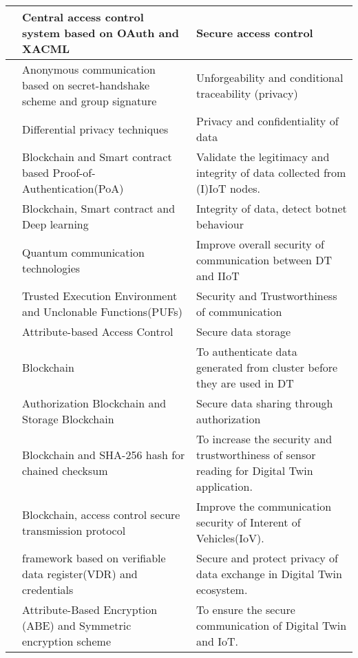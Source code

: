 \begin{table}[H]
\begin{NiceTabular}{|p{1.0cm}|p{5.5cm}|p{6.0cm}|}
    \cite{gehrmannDigitalTwinBased2020} & Central access control system based on OAuth and XACML &  Secure access control\\
    \hline
    \cite{xuEfficientAuthenticationVehicular2021} & Anonymous communication based on secret-handshake scheme and group signature & Unforgeability and conditional
traceability (privacy)\\
    \hline
    \cite{wuDeepLearningDriven2022} & Differential privacy techniques & Privacy and confidentiality of data \\
    \hline
    \cite{kumarBlockchainDeepLearning2022} & Blockchain and Smart contract based Proof-of-Authentication(PoA) & Validate the legitimacy and integrity of data collected from (I)IoT nodes. \\
    \hline
    \cite{salimBlockchainEnabledSecureDigital2022} & Blockchain, Smart contract and Deep learning & Integrity of data, detect botnet behaviour\\
    \hline
    \cite{lvDigitalTwinsBased2022} & Quantum communication technologies & Improve overall security of communication between DT and IIoT \\
    \hline
    \cite{debenedictisAdoptionSecureCyber2022} & Trusted Execution Environment and Unclonable Functions(PUFs)& Security and Trustworthiness of communication \\
    \hline
    \cite{chengzhelaiSPDTSecurePrivacyPreserving2022} & Attribute-based Access Control  & Secure data storage \\
    \hline
    \cite{chenDigitalTwinBasedHeuristic2023a} & Blockchain  & To authenticate data generated from cluster before they are used in DT \\
    \hline
    \cite{zhengBlockchainBasedTrustworthy2022a} & Authorization Blockchain and Storage Blockchain & Secure data sharing through authorization \\
    \hline
    \cite{danilczykBlockchainChecksumEstablishing2021a} & Blockchain and SHA-256 hash for chained checksum & To increase the security and trustworthiness of sensor reading for Digital Twin application.\\
    \hline
    \cite{liuBlockchainBasedSecureCommunication2022a} & Blockchain, access control secure transmission protocol & Improve the communication security of Interent of Vehicles(IoV).\\
    \hline
    \cite{pervezSIGNEDSmartCIty2023a} & framework based on verifiable data register(VDR) and credentials  & Secure and protect privacy of data exchange in Digital Twin ecosystem.\\
    \hline
    
     \cite{fengSensibleSecureIoT2021a} & Attribute-Based Encryption (ABE) and Symmetric encryption scheme & To ensure the secure communication of Digital Twin and IoT.\\

    
\bottomrule
\end{NiceTabular}
\end{table}